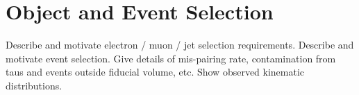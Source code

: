 \graphicspath{{Chapters/ObjEventSelection/Figures/}}
\chapter{Object and Event Selection}
\label{chap:ObjEventSelection}
Describe and motivate electron / muon / jet selection requirements.
Describe and motivate event selection. Give details of mis-pairing rate,
contamination from taus and events outside fiducial volume, etc.
Show observed kinematic distributions.
